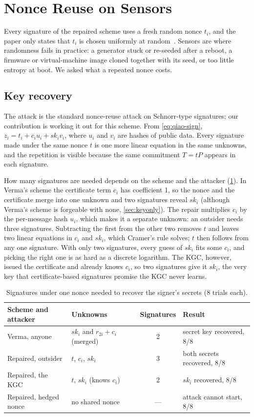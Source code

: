 \section{Nonce Reuse on Sensors}\label{sec:nonce}

Every signature of the repaired scheme uses a fresh random nonce $t_i$, and the paper only states that
$t_i$ is chosen uniformly at random~\cite{qiao2023}. Sensors are where randomness fails in practice: a
generator stuck or re-seeded after a reboot, a firmware or virtual-machine image cloned together with its
seed, or too little entropy at boot. We asked what a repeated nonce costs.

\subsection{Key recovery}
The attack is the standard nonce-reuse attack on Schnorr-type signatures; our contribution is working it
out for this scheme. From \cref{eq:qiao-sign}, $z_i=t_i+c_iu_i+sk_iv_i$, where $u_i$ and $v_i$ are hashes
of public data. Every signature made under the same nonce $t$ is one more linear equation in the same
unknowns, and the repetition is visible because the same commitment $T=tP$ appears in each signature.

How many signatures are needed depends on the scheme and the attacker (\cref{tab:nonce}). In Verma's
scheme the certificate term $c_i$ has coefficient 1, so the nonce and the certificate merge into one
unknown and two signatures reveal $sk_i$ (although Verma's scheme is forgeable with none,
\cref{sec:keyonly}). The repair multiplies $c_i$ by the per-message hash $u_i$, which makes it a separate
unknown: an outsider needs three signatures. Subtracting the first from the other two removes $t$ and
leaves two linear equations in $c_i$ and $sk_i$, which Cramer's rule solves; $t$ then follows from any one
signature. With only two signatures, every guess of $sk_i$ fits some $c_i$, and picking the right
one is as hard as a discrete logarithm. The KGC, however, issued the certificate and already knows $c_i$,
so two signatures give it $sk_i$, the very key that certificate-based signatures promise the KGC never
learns.

\begin{table}[ht]
\centering\small
\caption{Signatures under one nonce needed to recover the signer's secrets (8 trials each).}\label{tab:nonce}
\begin{tabular}{llcl}
\toprule
Scheme and attacker & Unknowns & Signatures & Result \\
\midrule
Verma, anyone & $sk_i$ and $r_{2i}+c_i$ (merged) & 2 & secret key recovered, 8/8 \\
Repaired, outsider & $t$, $c_i$, $sk_i$ & 3 & both secrets recovered, 8/8 \\
Repaired, the KGC & $t$, $sk_i$ (knows $c_i$) & 2 & $sk_i$ recovered, 8/8 \\
Repaired, hedged nonce & no shared nonce & --- & attack cannot start, 8/8 \\
\bottomrule
\end{tabular}
\end{table}

